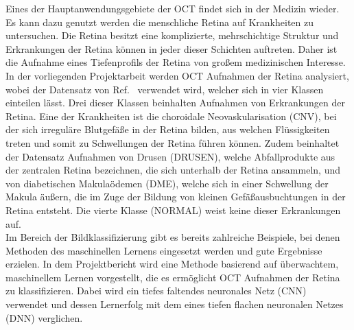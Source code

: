 Eines der Hauptanwendungsgebiete der OCT findet sich in der Medizin wieder. Es kann dazu genutzt werden die menschliche Retina auf Krankheiten zu untersuchen. Die Retina besitzt eine komplizierte, mehrschichtige Struktur und Erkrankungen der Retina können in jeder dieser Schichten auftreten. Daher ist die Aufnahme eines Tiefenprofils der Retina von gro{\ss}em medizinischen Interesse. \\
In der vorliegenden Projektarbeit werden OCT Aufnahmen der Retina analysiert, wobei der Datensatz von Ref.~\cite{Dataset} verwendet wird, welcher sich in vier Klassen einteilen lässt. Drei dieser Klassen beinhalten Aufnahmen von Erkrankungen der Retina. Eine der Krankheiten ist die choroidale Neovaskularisation (CNV), bei der sich irreguläre Blutgefä{\ss}e in der Retina bilden, aus welchen Flüssigkeiten treten und somit zu Schwellungen der Retina führen können. Zudem beinhaltet der Datensatz Aufnahmen von Drusen (DRUSEN), welche Abfallprodukte aus der zentralen Retina bezeichnen, die sich unterhalb der Retina ansammeln, und von diabetischen Makulaödemen (DME), welche sich in einer Schwellung der Makula äu{\ss}ern, die im Zuge der Bildung von kleinen Gefä{\ss}ausbuchtungen in der Retina entsteht. Die vierte Klasse (NORMAL) weist keine dieser Erkrankungen auf. \\
Im Bereich der Bildklassifizierung gibt es bereits zahlreiche Beispiele, bei denen Methoden des maschinellen Lernens eingesetzt werden und gute Ergebnisse erzielen. In dem Projektbericht wird eine Methode basierend auf überwachtem, maschinellem Lernen vorgestellt, die es ermöglicht OCT Aufnahmen der Retina zu klassifizieren. Dabei wird ein tiefes faltendes neuronales Netz (CNN) verwendet und dessen Lernerfolg mit dem eines tiefen flachen neuronalen Netzes (DNN) verglichen.